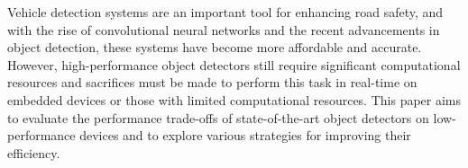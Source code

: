 


Vehicle detection systems are an important tool for enhancing road safety, and
with the rise of convolutional neural networks and the recent advancements in
object detection, these systems have become more affordable and accurate.
However, high-performance object detectors still require significant
computational resources and sacrifices must be made to perform this task in
real-time on embedded devices or those with limited computational resources.
This paper aims to evaluate the performance trade-offs of state-of-the-art
object detectors on low-performance devices and to explore various strategies
for improving their efficiency.

